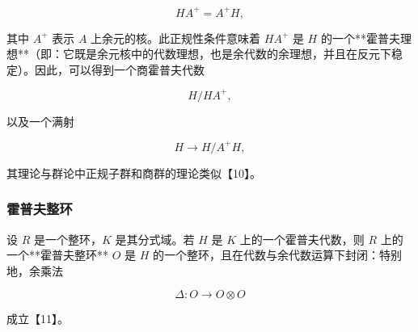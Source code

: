 $$
H A^{+} = A^{+} H,
$$

其中 $A^{+}$ 表示 $A$ 上余元的核。此正规性条件意味着 $H A^{+}$ 是 $H$ 的一个**霍普夫理想**（即：它既是余元核中的代数理想，也是余代数的余理想，并且在反元下稳定）。因此，可以得到一个商霍普夫代数

$$
H / H A^{+},
$$

以及一个满射

$$
H \to H / A^{+} H,
$$

其理论与群论中正规子群和商群的理论类似【10】。

\subsubsection{霍普夫整环}

设 $R$ 是一个整环，$K$ 是其分式域。若 $H$ 是 $K$ 上的一个霍普夫代数，则 $R$ 上的一个**霍普夫整环** $O$ 是 $H$ 的一个整环，且在代数与余代数运算下封闭：特别地，余乘法

$$
\Delta : O \to O \otimes O
$$

成立【11】。
